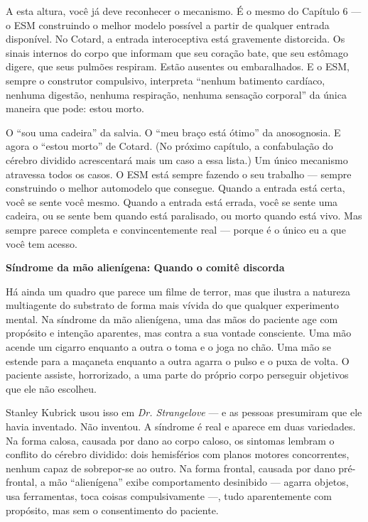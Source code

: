 \documentclass[11pt, twoside, openright]{book}
\begin{document}
A esta altura, você já deve reconhecer o mecanismo. É o mesmo do Capítulo 6 --- o ESM construindo o melhor modelo possível a partir de qualquer entrada disponível. No Cotard, a entrada interoceptiva está gravemente distorcida. Os sinais internos do corpo que informam que seu coração bate, que seu estômago digere, que seus pulmões respiram. Estão ausentes ou embaralhados. E o ESM, sempre o construtor compulsivo, interpreta ``nenhum batimento cardíaco, nenhuma digestão, nenhuma respiração, nenhuma sensação corporal'' da única maneira que pode: estou morto.

O ``sou uma cadeira'' da salvia. O ``meu braço está ótimo'' da anosognosia. E agora o ``estou morto'' de Cotard. (No próximo capítulo, a confabulação do cérebro dividido acrescentará mais um caso a essa lista.) Um único mecanismo atravessa todos os casos. O ESM está sempre fazendo o seu trabalho --- sempre construindo o melhor automodelo que consegue. Quando a entrada está certa, você se sente você mesmo. Quando a entrada está errada, você se sente uma cadeira, ou se sente bem quando está paralisado, ou morto quando está vivo. Mas sempre parece completa e convincentemente real --- porque é o único eu a que você tem acesso.

\textbf{Síndrome da mão alienígena: Quando o comitê discorda}

Há ainda um quadro que parece um filme de terror, mas que ilustra a natureza multiagente do substrato de forma mais vívida do que qualquer experimento mental. Na síndrome da mão alienígena, uma das mãos do paciente age com propósito e intenção aparentes, mas contra a sua vontade consciente. Uma mão acende um cigarro enquanto a outra o toma e o joga no chão. Uma mão se estende para a maçaneta enquanto a outra agarra o pulso e o puxa de volta. O paciente assiste, horrorizado, a uma parte do próprio corpo perseguir objetivos que ele não escolheu.

Stanley Kubrick usou isso em \textit{Dr. Strangelove} --- e as pessoas presumiram que ele havia inventado. Não inventou. A síndrome é real e aparece em duas variedades. Na forma calosa, causada por dano ao corpo caloso, os sintomas lembram o conflito do cérebro dividido: dois hemisférios com planos motores concorrentes, nenhum capaz de sobrepor-se ao outro. Na forma frontal, causada por dano pré-frontal, a mão ``alienígena'' exibe comportamento desinibido --- agarra objetos, usa ferramentas, toca coisas compulsivamente ---, tudo aparentemente com propósito, mas sem o consentimento do paciente.
\end{document}
